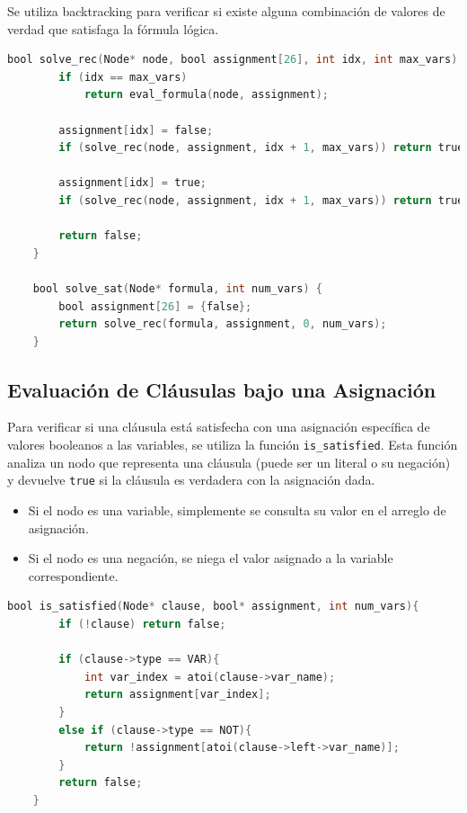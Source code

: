 \documentclass{report}
\begin{document}
	Se utiliza backtracking para verificar si existe alguna combinación de valores de verdad que satisfaga la fórmula lógica.

	\begin{lstlisting}[language=C, caption={Backtracking para resolver SAT}]
	bool solve_rec(Node* node, bool assignment[26], int idx, int max_vars) {
		if (idx == max_vars)
			return eval_formula(node, assignment);

		assignment[idx] = false;
		if (solve_rec(node, assignment, idx + 1, max_vars)) return true;

		assignment[idx] = true;
		if (solve_rec(node, assignment, idx + 1, max_vars)) return true;

		return false;
	}

	bool solve_sat(Node* formula, int num_vars) {
		bool assignment[26] = {false};
		return solve_rec(formula, assignment, 0, num_vars);
	}
	\end{lstlisting}

	\subsection{Evaluación de Cláusulas bajo una Asignación}

	Para verificar si una cláusula está satisfecha con una asignación específica de valores booleanos a las variables, se utiliza la función \texttt{is\_satisfied}. Esta función analiza un nodo que representa una cláusula (puede ser un literal o su negación) y devuelve \texttt{true} si la cláusula es verdadera con la asignación dada.

	\begin{itemize}
		\item Si el nodo es una variable, simplemente se consulta su valor en el arreglo de asignación.
		\item Si el nodo es una negación, se niega el valor asignado a la variable correspondiente.
	\end{itemize}

	\begin{lstlisting}[language=C, caption={Función para evaluar si una cláusula está satisfecha}]
	bool is_satisfied(Node* clause, bool* assignment, int num_vars){
		if (!clause) return false;

		if (clause->type == VAR){
			int var_index = atoi(clause->var_name);
			return assignment[var_index];
		} 
		else if (clause->type == NOT){
			return !assignment[atoi(clause->left->var_name)];
		}
		return false;
	}
	\end{lstlisting}
\end{document}
